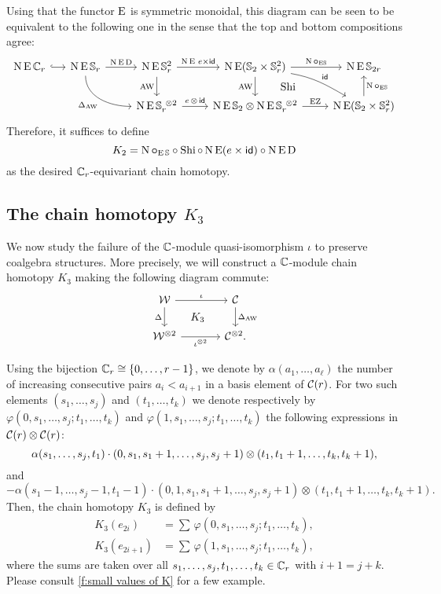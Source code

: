 Using that the functor $\operatorname{E}$ is symmetric monoidal, this diagram can be seen to be equivalent to the following one in the sense that the top and bottom compositions agree:
\[
\begin{tikzcd}
	\chains\EE\cyc_r
	\rar[hook]
	&[-10pt]
	\chains\EE\sym_r
	\rar["\chains\EE\rD"]
	\arrow[dr,in=180,out=-90,"\Delta_{\AW}"'] &
	\chains\EE\sym_r^2
	\rar["\chains\EE \, e \times \id"]
	\dar["\AW"'] &[0pt]
	\chains\EE(\sym_2 \times \sym_r^2)
	\rar["\chains\bcirc_{\EE\!\sym}"]
	\dar["\AW"']
	\drar["\id",out=-10,in=150] &
	\chains\EE\sym_{2r} \\ & &
	\chains\EE\sym_r^{\ \ot 2}
	\rar["e \,\ot\, \id"] &
	\chains\EE\sym_2 \ot \chains\EE\sym_r^{\ \ot 2}
	\rar["\EZ"]
	\uar["\Shi",phantom,shift right=30pt] &
	\chains\EE(\sym_2 \times \sym_r^2)
	\uar["\chains\bcirc_{\EE\!\sym}"']
\end{tikzcd}
\]
Therefore, it suffices to define
\[
K_2 = \operatorname{N}\bm{\circ}_{\operatorname{E}\mathbb{S}} \circ \operatorname{Shi} \circ \operatorname{N}\operatorname{E}(e \times \mathsf{id}) \circ \operatorname{N}\operatorname{E}\mathrm{D}
\]
as the desired $\mathbb{C}_r$-equivariant chain homotopy.

\subsection{The chain homotopy $K_3$} \label{ss:coproduct}

We now study the failure of the $\mathbb{C}$-module quasi-isomorphism $\iota$ to preserve coalgebra structures.
More precisely, we will construct a $\mathbb{C}$-module chain homotopy $K_3$ making the following diagram commute:
\begin{equation}\label{d:coproducts}
	\begin{tikzcd}[column sep=large]
			\cW \arrow[r,"\iota"] \arrow[d,"\Delta"'] \arrow[dr,phantom,"K_3"]&
			\cC \arrow[d,"\Delta_{\AW}"] \\
			\cW^{\ot 2} \arrow[r,"\iota^{\ot 2}"'] &
			\cC^{\ot 2}.
		\end{tikzcd}
\end{equation}

Using the bijection $\mathbb{C}_r \cong \{0,\dots,r-1\}$, we denote by $\alpha(a_1,\dots,a_\ell)$ the number of increasing consecutive pairs $a_i < a_{i+1}$ in a basis element of $\mathcal{C}(r)$.
For two such elements $(s_1,\dots,s_j)$ and $(t_1,\dots,t_k)$ we denote respectively by $\varphi(0,s_1,\dots,s_j;t_1,\dots,t_k)$ and $\varphi(1,s_1,\dots,s_j;t_1,\dots,t_k)$ the following expressions in $\mathcal{C}(r) \otimes \mathcal{C}(r)$:
\[
\alpha(s_1,\dots,s_j,t_1) \cdot
(0,s_1,s_1+1,\dots,s_j,s_j+1) \otimes
(t_1,t_1+1,\dots,t_k,t_k+1),
\]
and
\[
- \alpha(s_1-1,\dots,s_j-1,t_1-1) \cdot
(0,1,s_1,s_1+1,\dots,s_j,s_j+1)\otimes (t_1,t_1+1,\dots,t_k,t_k+1).
\]
Then, the chain homotopy $K_3$ is defined by
\[
\begin{split}
	K_3(e_{2i})   &= \sum \, \varphi(0,s_1,\dots,s_j;t_1,\dots,t_k), \\
	K_3(e_{2i+1}) &= \sum \, \varphi(1,s_1,\dots,s_j;t_1,\dots,t_k),
\end{split}
\]
where the sums are taken over all $s_1,\dots,s_j,t_1,\dots,t_k \in \mathbb{C}_r$ with $i+1 = j+k$.
Please consult \cref{f:small values of K} for a few example.

